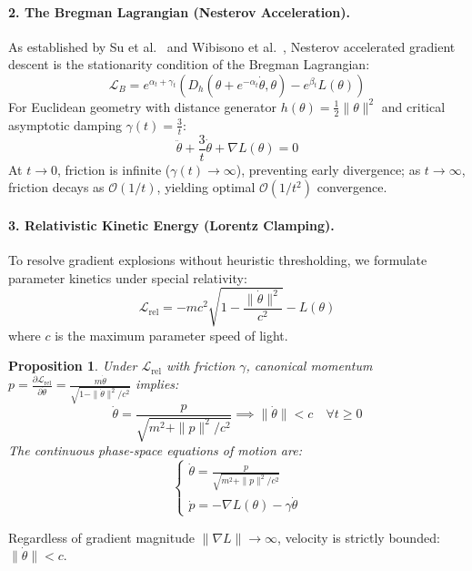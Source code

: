 \documentclass[10pt,twocolumn]{article}
\newtheorem{proposition}{Proposition}
\begin{document}
\paragraph{2. The Bregman Lagrangian (Nesterov Acceleration).}
As established by Su et al.\ \cite{su2016differential} and Wibisono et al.\ \cite{wibisono2016variational}, Nesterov accelerated gradient descent is the stationarity condition of the Bregman Lagrangian:
\begin{equation}
    \mathcal{L}_B = e^{\alpha_t + \gamma_t} \left( D_h(\theta + e^{-\alpha_t}\dot{\theta}, \theta) - e^{\beta_t} L(\theta) \right)
\end{equation}
For Euclidean geometry with distance generator $h(\theta) = \frac{1}{2}\|\theta\|^2$ and critical asymptotic damping $\gamma(t) = \frac{3}{t}$:
\begin{equation}
    \ddot{\theta} + \frac{3}{t}\dot{\theta} + \nabla L(\theta) = 0
\end{equation}
At $t \to 0$, friction is infinite ($\gamma(t) \to \infty$), preventing early divergence; as $t \to \infty$, friction decays as $\mathcal{O}(1/t)$, yielding optimal $\mathcal{O}(1/t^2)$ convergence.

\paragraph{3. Relativistic Kinetic Energy (Lorentz Clamping).}
To resolve gradient explosions without heuristic thresholding, we formulate parameter kinetics under special relativity:
\begin{equation}
    \mathcal{L}_{\text{rel}} = -m c^2 \sqrt{1 - \frac{\|\dot{\theta}\|^2}{c^2}} - L(\theta)
\end{equation}
where $c$ is the maximum parameter speed of light.
\begin{proposition}
Under $\mathcal{L}_{\text{rel}}$ with friction $\gamma$, canonical momentum $p = \frac{\partial \mathcal{L}_{\text{rel}}}{\partial \dot{\theta}} = \frac{m \dot{\theta}}{\sqrt{1 - \|\dot{\theta}\|^2/c^2}}$ implies:
\begin{equation}
    \dot{\theta} = \frac{p}{\sqrt{m^2 + \|p\|^2/c^2}} \implies \|\dot{\theta}\| < c \quad \forall t \ge 0
\end{equation}
The continuous phase-space equations of motion are:
\begin{equation}
    \begin{cases}
        \dot{\theta} = \frac{p}{\sqrt{m^2 + \|p\|^2/c^2}} \\
        \dot{p} = -\nabla L(\theta) - \gamma \dot{\theta}
    \end{cases}
\end{equation}
\end{proposition}
Regardless of gradient magnitude $\|\nabla L\| \to \infty$, velocity is strictly bounded: $\|\dot{\theta}\| < c$.
\end{document}

